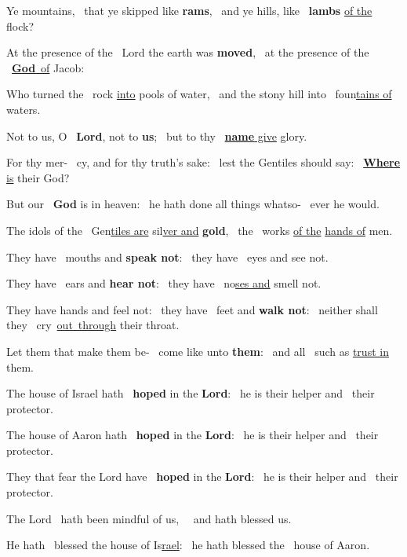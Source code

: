 \documentclass[12pt]{article} %
\newenvironment{psalmtext}{\leftskip 0.25in}{\vspace{1 mm}}
\def\pipe{\textcolor{benred8}{\textdoublepipe}}
\let\oldgresixstar\gresixstar
\renewcommand{\gresixstar}{\textcolor{benred8}{\oldgresixstar}}
\let\oldgredagger\gredagger
\renewcommand{\gredagger}{\textcolor{benred8}{\oldgredagger}}
\begin{document}
\begin{pages}
\begin{Rightside}
\begin{psalmtext}
Ye mountains, \pipe\ that ye skipped like \textbf{rams}, \gresixstar\ and ye hills, like \pipe\ \textbf{lambs} \uline{of the} flock?

At the presence of the \pipe\ Lord the earth was \textbf{moved}, \gresixstar\ at the presence of the \pipe\ \uline{\textbf{God}~of} Jacob:

Who turned the \pipe\ rock \uline{into} pools of water, \gresixstar\ and the stony hill into \pipe\ foun\uline{tains of} waters.

Not to us, O \pipe\ \textbf{Lord}, not to \textbf{us}; \gresixstar\ but to thy \pipe\ \uline{\textbf{name} give} glory.

For thy mer- \pipe\ cy, and for thy truth's sake: \gresixstar\ lest the Gentiles should say: \pipe\ \uline{\textbf{Where} is} their God?

But our \pipe\ \textbf{God} is in heaven: \gresixstar\ he hath done all things whatso- \pipe\ ever he would.

The idols of the \pipe\ Gen\uline{tiles are} sil\uline{ver and} \textbf{gold}, \gresixstar\ the \pipe\ works \uline{of the} \uline{hands of} men.

They have \pipe\ mouths and \textbf{speak not}: \gresixstar\ they have \pipe\ eyes and see not.

They have \pipe\ ears and \textbf{hear not}: \gresixstar\ they have \pipe\ no\uline{ses and} smell not.

They have hands and feel not: \gredagger\ they have \pipe\ feet and \textbf{walk not}: \gresixstar\ neither shall they \pipe\ cry~\uline{out~through} their throat.

Let them that make them be- \pipe\ come like unto \textbf{them}: \gresixstar\ and all \pipe\ such as \uline{trust in} them.

The house of Israel hath \pipe\ \textbf{hoped} in the \textbf{Lord}: \gresixstar\ he is their helper and \pipe\ their protector.

The house of Aaron hath \pipe\ \textbf{hoped} in the \textbf{Lord}: \gresixstar\ he is their helper and \pipe\ their protector.

They that fear the Lord have \pipe\ \textbf{hoped} in the \textbf{Lord}: \gresixstar\ he is their helper and \pipe\ their protector.

The Lord \pipe\ hath been mindful of us, \gresixstar\ \pipe\ and hath blessed us.

He hath \pipe\ blessed the house of Is\uline{rael}: \gresixstar\ he hath blessed the \pipe\ house of Aaron.


\end{psalmtext}
\end{Rightside}
\end{pages}
\end{document}
